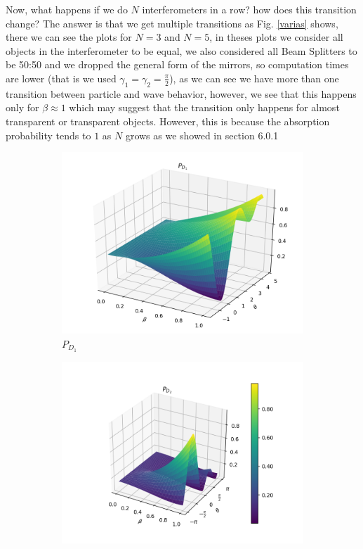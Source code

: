 \documentclass{book}
\begin{document}
Now, what happens if we do $N$ interferometers in a row? how does this transition change? The answer is that we get multiple transitions as Fig. \ref{varias} shows, there we can see the plots for $N=3$ and $N=5$, in theses plots we consider all objects in the interferometer to be equal, we also considered all Beam Splitters to be 50:50 and we dropped the general form of the mirrors, so computation times are lower (that is we used $\gamma_{1}=\gamma_{2}=\frac{\pi}{2}$), as we can see we have more than one transition between particle and wave behavior, however, we see that this happens only for $\beta \approx 1$ which may suggest that the transition only happens for almost transparent or transparent objects. However, this is because the absorption probability tends to $1$ as $N$ grows as we showed in section 6.0.1
\begin{figure}[H]
\centering
\begin{subfigure}[b]{0.30\linewidth}
\includegraphics[width=\linewidth]{images/pd1_3.png}
\caption{$P_{D_{1}}$}
\end{subfigure}
\begin{subfigure}[b]{0.30\linewidth}
\includegraphics[width=\linewidth]{images/pd2_3.png}

\end{subfigure}
\end{figure}
\end{document}
